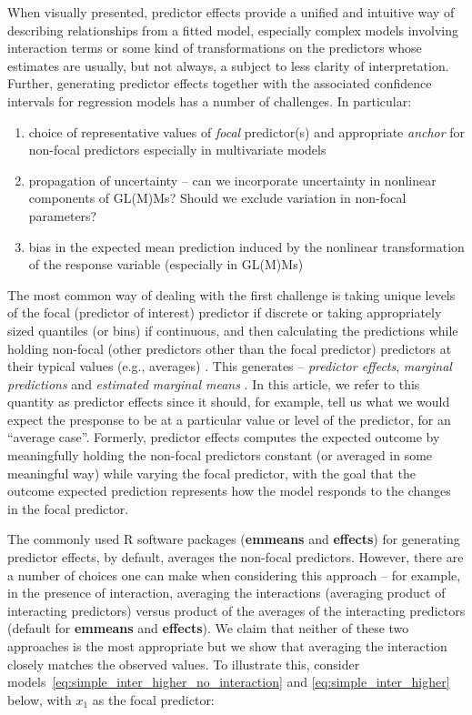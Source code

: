 \documentclass[10pt,letterpaper]{article}
\newcommand{\pkg}[1]{\textbf{#1}}
\let\proglang=\textsf
\begin{document}
When visually presented, predictor effects provide a unified and intuitive way of describing relationships from a fitted model, especially complex models involving interaction terms or some kind of transformations on the predictors whose estimates are usually, but not always, a subject to less clarity of interpretation. Further, generating predictor effects together with the associated confidence intervals for regression models has a number of challenges. In particular:
\begin{enumerate}
\item choice of representative values of \emph{focal} predictor(s) and appropriate \emph{anchor} for non-focal predictors especially in multivariate models
\item  propagation of uncertainty -- can we incorporate uncertainty in nonlinear components of GL(M)Ms? Should we exclude variation in non-focal parameters?
\item bias in the expected mean prediction induced by the nonlinear transformation of the response variable (especially in GL(M)Ms)
\end{enumerate}

The most common way of dealing with the first challenge is taking unique levels of the focal (predictor of interest) predictor if discrete or taking appropriately sized quantiles (or bins) if continuous, and then calculating the predictions while holding non-focal (other predictors other than the focal predictor) predictors at their typical values (e.g., averages) \cite{hanmer2013behind}. This generates -- \emph{predictor effects}\cite{fox2009effect}, \emph{marginal predictions} \cite{leeper2017package} and \emph{estimated marginal means} \cite{lenth2018package}. In this article, we refer to this quantity as predictor effects since it should, for example, tell us what we would expect the presponse to be at a particular value or level of the predictor, for an ``average case''. Formerly, predictor effects computes the expected outcome by meaningfully holding the non-focal predictors constant (or averaged in some meaningful way) while varying the focal predictor, with the goal that the outcome expected prediction represents how the model responds to the changes in the focal predictor.

The commonly used \proglang{R} software packages (\pkg{emmeans} and \pkg{effects}) for generating predictor effects, by default, averages the non-focal predictors. However, there are a number of choices one can make when considering this approach -- for example, in the presence of interaction, averaging the interactions (averaging product of interacting predictors) versus product of the averages of the interacting predictors (default for \pkg{emmeans} and \pkg{effects}). We claim that neither of these two approaches is the most appropriate but we show that averaging the interaction closely matches the observed values. To illustrate this, consider models~\ref{eq:simple_inter_higher_no_interaction} and \ref{eq:simple_inter_higher} below, with $x_1$ as the focal predictor:
\end{document}
